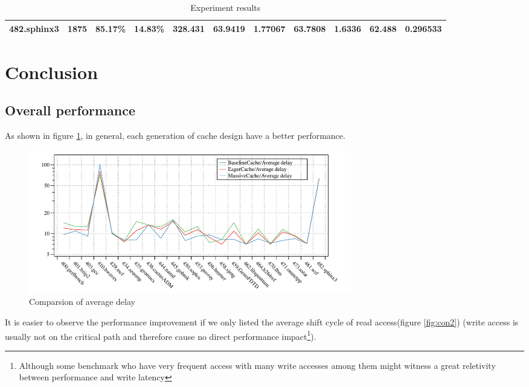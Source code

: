 \documentclass[11pt]{article}
\begin{document}
\begin{landscape}
\begin{table}
\begin{tabular}{lllllllllll}
482.sphinx3                                                                               & 1875                                                                                         & 85.17\%                                                                                         & 14.83\%                                                                                          & 328.431                                                                                          & 63.9419                           & 1.77067                           & 63.7808                           & 1.6336                            & 62.488                            & 0.296533                         \\
\bottomrule
\end{tabular}
\caption{Experiment results}
\label{tab:big}
\end{table}
\end{landscape}
\restoregeometry

\section{Conclusion}
\subsection{Overall performance}
As shown in figure \ref{fig:con1}, in general, each generation of cache design have a better performance.

\begin{figure}
\centering
\includegraphics[width=400pt]{con1.pdf}
\caption{Comparsion of average delay}
\label{fig:con1}
\end{figure}

It is easier to observe the performance improvement if we only listed the average shift cycle of read access(figure \ref{fig:con2}) (write access is usually not on the critical path and therefore cause no direct performance impact\footnote{Although some benchmark who have very frequent access with many write accesses among them might witness a great reletivity between performance and write latency}).
\end{document}
